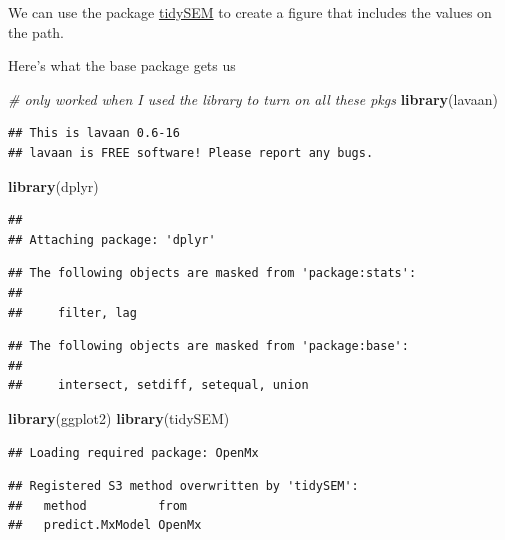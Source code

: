\documentclass[
  11pt,
]{book}
\newenvironment{Shaded}{\begin{snugshade}}{\end{snugshade}}
\newcommand{\CommentTok}[1]{\textcolor[rgb]{0.37,0.37,0.37}{\textit{#1}}}
\newcommand{\FunctionTok}[1]{\textcolor[rgb]{0.27,0.27,0.27}{\textbf{#1}}}
\newcommand{\NormalTok}[1]{#1}
\begin{document}
We can use the package \href{https://cjvanlissa.github.io/tidySEM/articles/Plotting_graphs.html}{tidySEM} to create a figure that includes the values on the path.

Here's what the base package gets us

\begin{Shaded}
\begin{Highlighting}[]
\CommentTok{\# only worked when I used the library to turn on all these pkgs}
\FunctionTok{library}\NormalTok{(lavaan)}
\end{Highlighting}
\end{Shaded}

\begin{verbatim}
## This is lavaan 0.6-16
## lavaan is FREE software! Please report any bugs.
\end{verbatim}

\begin{Shaded}
\begin{Highlighting}[]
\FunctionTok{library}\NormalTok{(dplyr)}
\end{Highlighting}
\end{Shaded}

\begin{verbatim}
## 
## Attaching package: 'dplyr'
\end{verbatim}

\begin{verbatim}
## The following objects are masked from 'package:stats':
## 
##     filter, lag
\end{verbatim}

\begin{verbatim}
## The following objects are masked from 'package:base':
## 
##     intersect, setdiff, setequal, union
\end{verbatim}

\begin{Shaded}
\begin{Highlighting}[]
\FunctionTok{library}\NormalTok{(ggplot2)}
\FunctionTok{library}\NormalTok{(tidySEM)}
\end{Highlighting}
\end{Shaded}

\begin{verbatim}
## Loading required package: OpenMx
\end{verbatim}

\begin{verbatim}
## Registered S3 method overwritten by 'tidySEM':
##   method          from  
##   predict.MxModel OpenMx
\end{verbatim}
\end{document}
